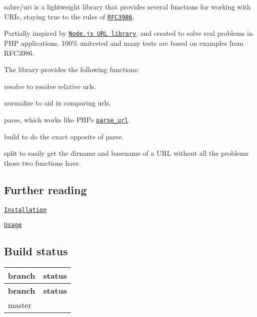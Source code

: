 sabre/uri is a lightweight library that provides several functions for working with U\+R\+Is, staying true to the rules of \href{https://tools.ietf.org/html/rfc3986/}{\tt R\+F\+C3986}.

Partially inspired by \href{http://nodejs.org/api/url.html}{\tt Node.\+js U\+RL library}, and created to solve real problems in P\+HP applications. 100\% unitested and many tests are based on examples from R\+F\+C3986.

The library provides the following functions\+:


\begin{DoxyEnumerate}
\item {\ttfamily resolve} to resolve relative urls.
\item {\ttfamily normalize} to aid in comparing urls.
\item {\ttfamily parse}, which works like P\+HP\textquotesingle{}s \href{http://php.net/manual/en/function.parse-url.php}{\tt parse\+\_\+url}.
\item {\ttfamily build} to do the exact opposite of {\ttfamily parse}.
\item {\ttfamily split} to easily get the \textquotesingle{}dirname\textquotesingle{} and \textquotesingle{}basename\textquotesingle{} of a U\+RL without all the problems those two functions have.
\end{DoxyEnumerate}

\subsection*{Further reading }


\begin{DoxyItemize}
\item \href{http://sabre.io/uri/install/}{\tt Installation}
\item \href{http://sabre.io/uri/usage/}{\tt Usage}
\end{DoxyItemize}

\subsection*{Build status }

\tabulinesep=1mm
\begin{longtabu} spread 0pt [c]{*{2}{|X[-1]}|}
\hline
\rowcolor{\tableheadbgcolor}\textbf{ branch  }&\textbf{ status   }\\
\endfirsthead
\hline
\endfoot
\hline
\rowcolor{\tableheadbgcolor}\textbf{ branch  }&\textbf{ status   }\\
\endhead
master  &\href{https://travis-ci.org/fruux/sabre-uri}{\tt }   \\
\end{longtabu}


